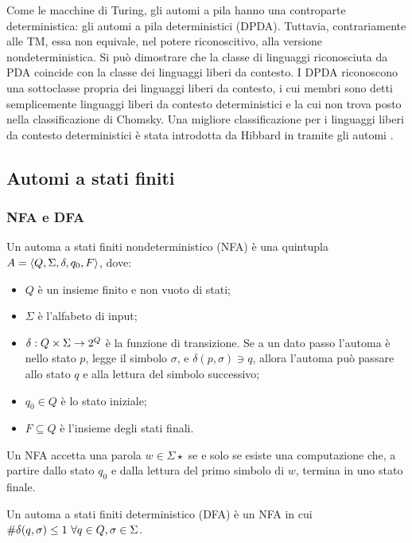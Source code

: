 Come le macchine di Turing, gli automi a pila hanno una controparte deterministica: gli automi a pila deterministici (DPDA). Tuttavia, contrariamente alle TM, essa non equivale, nel potere riconoscitivo, alla versione nondeterministica. Si può dimostrare che la classe di linguaggi riconosciuta da PDA coincide con la classe dei linguaggi liberi da contesto. I DPDA riconoscono una sottoclasse propria dei linguaggi liberi da contesto, i cui membri sono detti semplicemente linguaggi liberi da contesto deterministici e la cui non trova posto nella classificazione di Chomsky. Una migliore classificazione per i linguaggi liberi da contesto deterministici è stata introdotta da Hibbard in \cite{Hibbard:67:CFdet} tramite gli automi .


\subsection{Automi a stati finiti}\label{subs:prel:NFA}

\subsubsection{NFA e DFA}
\begin{defin}
	Un automa a stati finiti nondeterministico (NFA) è una quintupla $A=\langle Q,\Sigma,\delta,q_0,F \rangle$, dove:
	\begin{itemize}
		\item $Q$ è un insieme finito e non vuoto di stati;
		\item $\Sigma$ è l'alfabeto di input;
		\item $\delta:Q\times\Sigma\to2^{Q}$ è la funzione di transizione. Se a un dato passo l'automa è nello stato $p$, legge il simbolo $\sigma$, e $\delta(p,\sigma)\ni q$, allora l'automa può passare allo stato $q$ e alla lettura del simbolo successivo;
		\item $q_0\in Q$ è lo stato iniziale;
		\item $F\subseteq Q$ è l'insieme degli stati finali.
	\end{itemize}
	Un NFA accetta una parola $w\in\Sigma\star$ se e solo se esiste una computazione che, a partire dallo stato $q_0$ e dalla lettura del primo simbolo di $w$, termina in uno stato finale.
\end{defin}
\begin{defin}
	Un automa a stati finiti deterministico (DFA) è un NFA in cui $\# \delta(q,\sigma)\leq 1 ~ \forall q\in Q,\sigma\in\Sigma$.
\end{defin}

